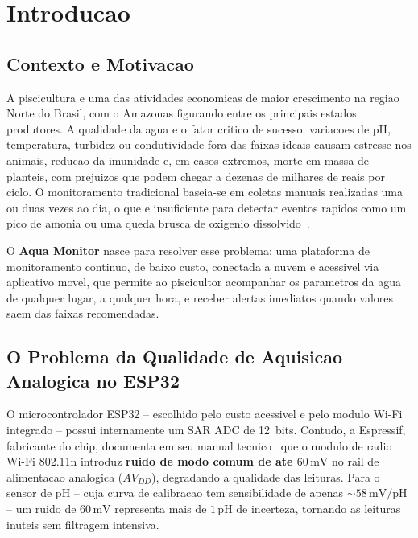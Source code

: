 \documentclass[12pt, a4paper]{article}
\begin{document}
\section{Introducao}

\subsection{Contexto e Motivacao}

A piscicultura e uma das atividades economicas de maior crescimento na regiao Norte do Brasil,
com o Amazonas figurando entre os principais estados produtores. A qualidade da agua e o
fator critico de sucesso: variacoes de pH, temperatura, turbidez ou condutividade fora das
faixas ideais causam estresse nos animais, reducao da imunidade e, em casos extremos, morte
em massa de planteis, com prejuizos que podem chegar a dezenas de milhares de reais por ciclo.
O monitoramento tradicional baseia-se em coletas manuais realizadas uma ou duas vezes ao dia,
o que e insuficiente para detectar eventos rapidos como um pico de amonia ou uma queda brusca
de oxigenio dissolvido~\cite{aquaculture2019}.

O \textbf{Aqua Monitor} nasce para resolver esse problema: uma plataforma de monitoramento
continuo, de baixo custo, conectada a nuvem e acessivel via aplicativo movel, que permite ao
piscicultor acompanhar os parametros da agua de qualquer lugar, a qualquer hora, e receber
alertas imediatos quando valores saem das faixas recomendadas.

\subsection{O Problema da Qualidade de Aquisicao Analogica no ESP32}

O microcontrolador ESP32 -- escolhido pelo custo acessivel e pelo modulo Wi-Fi integrado --
possui internamente um SAR ADC de 12~bits. Contudo, a Espressif, fabricante do chip, documenta
em seu manual tecnico~\cite{espressif2023} que o modulo de radio Wi-Fi 802.11n introduz
\textbf{ruido de modo comum de ate $60\,\text{mV}$} no rail de alimentacao analogica ($AV_{DD}$),
degradando a qualidade das leituras. Para o sensor de pH -- cuja curva de calibracao tem
sensibilidade de apenas $\sim 58\,\text{mV}/\text{pH}$ -- um ruido de $60\,\text{mV}$ representa
mais de $1\,\text{pH}$ de incerteza, tornando as leituras inuteis sem filtragem intensiva.
\end{document}
